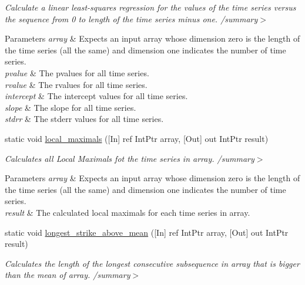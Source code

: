 \begin{DoxyCompactItemize}
\begin{DoxyCompactList}\small\item\em Calculate a linear least-\/squares regression for the values of the time series versus the sequence from 0 to length of the time series minus one. /summary$>$ 
\begin{DoxyParams}{Parameters}
{\em array} & Expects an input array whose dimension zero is the length of the time series (all the same) and dimension one indicates the number of time series.\\
\hline
{\em pvalue} & The pvalues for all time series.\\
\hline
{\em rvalue} & The rvalues for all time series.\\
\hline
{\em intercept} & The intercept values for all time series.\\
\hline
{\em slope} & The slope for all time series.\\
\hline
{\em stdrr} & The stderr values for all time series.\\
\hline
\end{DoxyParams}
\end{DoxyCompactList}\item 
static void \mbox{\hyperlink{classkhiva_1_1interop_1_1_d_l_l_features_a2da29b6a1c0287cb219a6a4731ce3850}{local\+\_\+maximals}} (\mbox{[}In\mbox{]} ref Int\+Ptr array, \mbox{[}Out\mbox{]} out Int\+Ptr result)
\begin{DoxyCompactList}\small\item\em Calculates all Local Maximals fot the time series in array. /summary$>$ 
\begin{DoxyParams}{Parameters}
{\em array} & Expects an input array whose dimension zero is the length of the time series (all the same) and dimension one indicates the number of time series.\\
\hline
{\em result} & The calculated local maximals for each time series in array.\\
\hline
\end{DoxyParams}
\end{DoxyCompactList}\item 
static void \mbox{\hyperlink{classkhiva_1_1interop_1_1_d_l_l_features_a5f10b0f0c8a164e833332bf8dadc4be8}{longest\+\_\+strike\+\_\+above\+\_\+mean}} (\mbox{[}In\mbox{]} ref Int\+Ptr array, \mbox{[}Out\mbox{]} out Int\+Ptr result)
\begin{DoxyCompactList}\small\item\em Calculates the length of the longest consecutive subsequence in array that is bigger than the mean of array. /summary$>$ 

\end{DoxyCompactList}
\end{DoxyCompactItemize}
